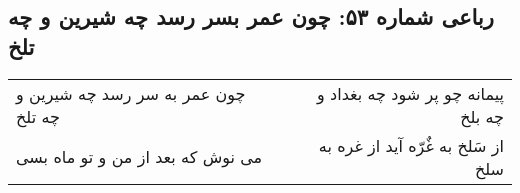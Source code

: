 \begin{center}
\section*{رباعی شماره ۵۳: چون عمر بسر رسد چه شیرین و چه تلخ}
\label{sec:sh053}
\begin{longtable}{l p{0.5cm} r}
چون عمر به سر رسد چه شیرین و چه تلخ
&&
پیمانه چو پر شود چه بغداد و چه بلخ
\\
می نوش که بعد از من و تو ماه بسی
&&
از سَلخ به غٌرّه آید از غره به سلخ
\\
\end{longtable}
\end{center}
